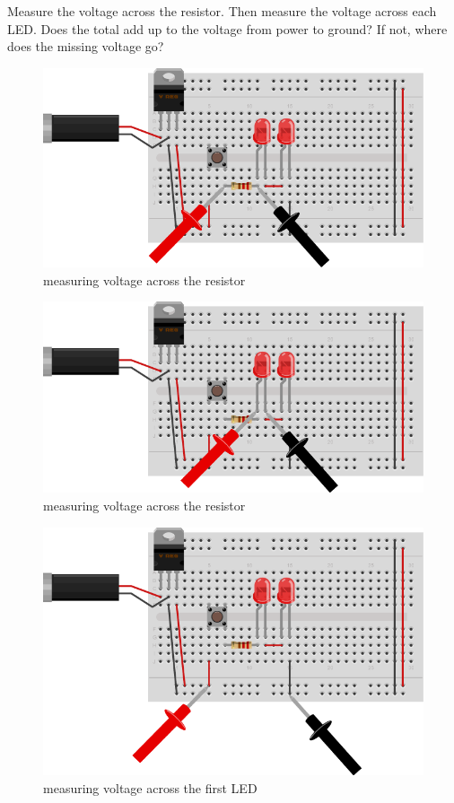 Measure the voltage across the resistor. Then measure the voltage across each LED. Does the total add up to the voltage from power to ground? If not, where does the missing voltage go?

\begin{figure}[!htb]
 \centering
 \includegraphics[scale=0.8]{img/electronics/voltage_across_resistor.png}
 \caption{measuring voltage across the resistor}
 \label{measuring voltage across the resistor}
\end{figure}

\begin{figure}[!htb]
 \centering
 \includegraphics[scale=0.8]{img/electronics/voltage_across_led.png}
 \caption{measuring voltage across the resistor}
 \label{measuring voltage across the resistor}
\end{figure}

\begin{figure}[!htb]
 \centering
 \includegraphics[scale=0.8]{img/electronics/voltage_power_ground.png}
 \caption{measuring voltage across the first LED}
 \label{measuring voltage across the first LED}
\end{figure}

